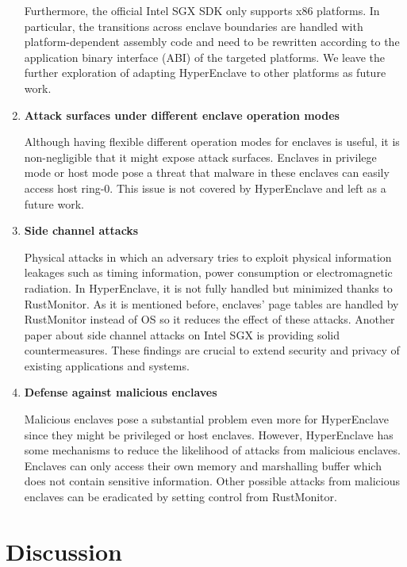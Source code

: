 \begin{enumerate}
        Furthermore, the official Intel SGX SDK only supports x86 platforms. In particular, the transitions across enclave boundaries are handled with platform-dependent assembly code and need to be rewritten according to the application binary interface (ABI) of the targeted platforms. We leave the further exploration of adapting HyperEnclave to other platforms as future work.

    \item \textbf{Attack surfaces under different enclave operation modes}

    Although having flexible different operation modes for enclaves is useful, it is non-negligible that it might expose attack surfaces. Enclaves in privilege mode or host mode pose a threat that malware in these enclaves can easily access host ring-0. This issue is not covered by HyperEnclave and left as a future work.

    \item \textbf{Side channel attacks}

        Physical attacks in which an adversary tries to exploit physical information leakages such as timing information, power consumption or electromagnetic radiation. \cite{Standaert2010-cm} In HyperEnclave, it is not fully handled but minimized thanks to RustMonitor. As it is mentioned before, enclaves’ page tables are handled by RustMonitor instead of OS so it reduces the effect of these attacks. Another paper\cite{280800} about side channel attacks on Intel SGX is providing solid countermeasures. These findings are crucial to extend security and privacy of existing applications and systems. 

    \newpage 
    \item \textbf{Defense against malicious enclaves}
    
    Malicious enclaves pose a substantial problem even more for HyperEnclave since they might be privileged or host enclaves. However, HyperEnclave has some mechanisms to reduce the likelihood of attacks from malicious enclaves. Enclaves can only access their own memory and marshalling buffer which does not contain sensitive information. Other possible attacks from malicious enclaves can be eradicated by setting control from RustMonitor.            
    
\end{enumerate}



\section{Discussion}

